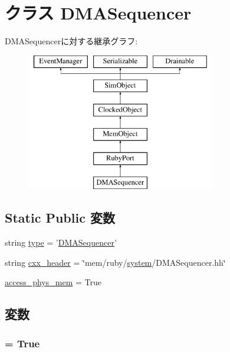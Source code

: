 \hypertarget{classSequencer_1_1DMASequencer}{
\section{クラス DMASequencer}
\label{classSequencer_1_1DMASequencer}
}
DMASequencerに対する継承グラフ:\begin{figure}[H]
\begin{center}
\leavevmode
\includegraphics[height=6cm]{classSequencer_1_1DMASequencer}
\end{center}
\end{figure}
\subsection*{Static Public 変数}
\begin{DoxyCompactItemize}
\item 
string \hyperlink{classSequencer_1_1DMASequencer_acce15679d830831b0bbe8ebc2a60b2ca}{type} = '\hyperlink{classSequencer_1_1DMASequencer}{DMASequencer}'
\item 
string \hyperlink{classSequencer_1_1DMASequencer_a17da7064bc5c518791f0c891eff05fda}{cxx\_\-header} = \char`\"{}mem/ruby/\hyperlink{classSequencer_1_1RubyPort_ab737471139f5a296e5b26e8a0e1b0744}{system}/DMASequencer.hh\char`\"{}
\item 
\hyperlink{classSequencer_1_1DMASequencer_a6b007d00105ce28d41448c23f68c5ec1}{access\_\-phys\_\-mem} = True
\end{DoxyCompactItemize}


\subsection{変数}
\hypertarget{classSequencer_1_1DMASequencer_a6b007d00105ce28d41448c23f68c5ec1}{
\subsubsection[{access\_\-phys\_\-mem}]{ = True}}
\label{classSequencer_1_1DMASequencer_a6b007d00105ce28d41448c23f68c5ec1}


